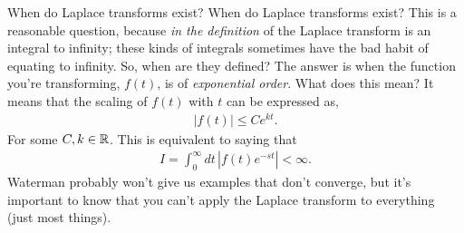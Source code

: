 \documentclass[11pt]{article}
\theoremstyle{mystyle}
\begin{document}
\begin{psremark}{When do Laplace transforms exist?}{}
    When do Laplace transforms exist? This is a reasonable
    question, because \emph{in the definition} of the Laplace
    transform is an integral to infinity; these kinds of integrals
    sometimes have the bad habit of equating to infinity.
    So, when are they defined? The answer is when the
    function you're transforming, $f(t)$, is of
    \emph{exponential order}. What does this mean?
    It means that the scaling of $f(t)$ with $t$
    can be expressed as,
    \begin{align*}
        |f(t)| \leq Ce^{kt}.
    \end{align*}
    For some $C, k \in \mathbb{R}$. This is equivalent to saying that
    \begin{align*}
        I = \int_0^\infty dt \, |f(t) e^{-st}| < \infty.
    \end{align*}
    Waterman probably won't give us examples that don't
    converge, but it's important to know that you can't
    apply the Laplace transform to everything (just
    most things).
\end{psremark}
\end{document}
